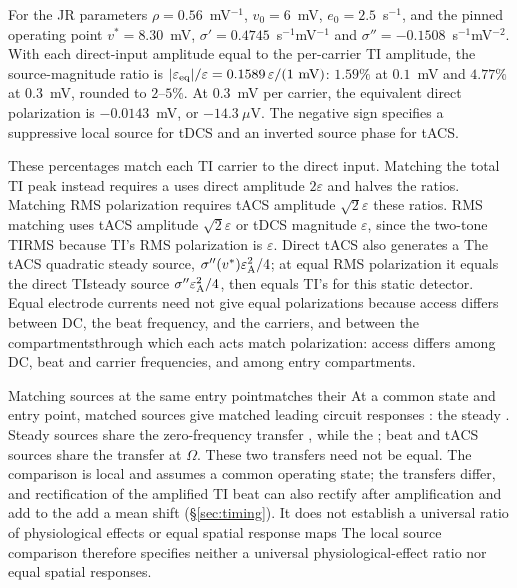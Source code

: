 \documentclass[11pt,a4paper]{article}
\newcommand{\Sig}{\sigma}
\providecommand{\DIFaddtex}[1]{{\protect\color{blue} \sf #1}} %
\providecommand{\DIFdeltex}[1]{{\protect\color{red} \scriptsize #1}} %
\providecommand{\DIFaddbegin}{} %
\providecommand{\DIFaddend}{} %
\providecommand{\DIFdelbegin}{} %
\providecommand{\DIFdelend}{} %
\providecommand{\DIFadd}[1]{\texorpdfstring{\DIFaddtex{#1}}{#1}} %
\providecommand{\DIFdel}[1]{\texorpdfstring{\DIFdeltex{#1}}{}} %
\begin{document}
For the JR parameters $\rho=0.56$~mV$^{-1}$, $v_0=6$~mV,
$e_0=2.5$~s$^{-1}$, and the pinned operating point $v^*=8.30$~mV,
$\Sig'=0.4745$~s$^{-1}$mV$^{-1}$ and
$\Sig''=-0.1508$~s$^{-1}$mV$^{-2}$. With each direct-input amplitude
equal to the per-carrier TI amplitude, the source-magnitude ratio is
$|\varepsilon_{\rm eq}|/\varepsilon
=0.1589\,\varepsilon/(1~\mathrm{mV})$:
$1.59\%$ at $0.1$~mV and $4.77\%$ at $0.3$~mV, rounded to $2$--$5\%$.
At $0.3$~mV per carrier, the equivalent direct polarization is
$-0.0143$~mV, or $-14.3~\mu$V. The negative sign specifies a suppressive
local source for tDCS and an inverted source phase for tACS.

\DIFdelbegin \DIFdel{These percentages match each TI carrier to the direct input. }\DIFdelend Matching the total TI peak instead \DIFdelbegin \DIFdel{requires a }\DIFdelend \DIFaddbegin \DIFadd{uses }\DIFaddend direct amplitude $2\varepsilon$
and halves \DIFdelbegin \DIFdel{the ratios. Matching RMS polarization requires tACS amplitude
$\sqrt{2}\varepsilon$ }\DIFdelend \DIFaddbegin \DIFadd{these ratios. RMS matching uses tACS amplitude
$\sqrt2\varepsilon$ }\DIFaddend or tDCS magnitude $\varepsilon$, \DIFdelbegin \DIFdel{since the two-tone
TIRMS }\DIFdelend \DIFaddbegin \DIFadd{because TI's RMS
polarization }\DIFaddend is $\varepsilon$. \DIFdelbegin \DIFdel{Direct tACS also generates a }\DIFdelend \DIFaddbegin \DIFadd{The tACS }\DIFaddend quadratic steady source,
\DIFdelbegin \DIFdel{$\Sig''(v^*)\varepsilon_{\rm A}^2/4$; at equal RMS polarization it
equals the direct TIsteady source }\DIFdelend \DIFaddbegin \DIFadd{$\Sig''\varepsilon_{\rm A}^2/4$, then equals TI's }\DIFaddend for this static detector.
Equal electrode currents need not \DIFdelbegin \DIFdel{give equal polarizations because access differs between DC, the beat frequency, and the carriers, and between the compartmentsthrough which each acts}\DIFdelend \DIFaddbegin \DIFadd{match polarization: access differs among
DC, beat and carrier frequencies, and among entry compartments}\DIFaddend .

\DIFdelbegin \DIFdel{Matching sources at the same entry pointmatches their }\DIFdelend \DIFaddbegin \DIFadd{At a common state and entry point, matched sources give matched }\DIFaddend leading
circuit responses\DIFdelbegin \DIFdel{:
the steady }\DIFdelend \DIFaddbegin \DIFadd{. Steady }\DIFaddend sources share the zero-frequency transfer\DIFdelbegin \DIFdel{, while the }\DIFdelend \DIFaddbegin \DIFadd{; }\DIFaddend beat
and tACS sources share the transfer at $\Omega$. These \DIFdelbegin \DIFdel{two transfers need not be equal.
The comparison is local and assumes a common operating state; the }\DIFdelend \DIFaddbegin \DIFadd{transfers differ,
and rectification of the amplified }\DIFaddend TI beat can \DIFdelbegin \DIFdel{also rectify after amplification and add to the }\DIFdelend \DIFaddbegin \DIFadd{add a }\DIFaddend mean shift
(\S\ref{sec:timing}). \DIFdelbegin \DIFdel{It does not establish a universal ratio of physiological
effects or equal spatial response maps}\DIFdelend \DIFaddbegin \DIFadd{The local source comparison therefore specifies
neither a universal physiological-effect ratio nor equal spatial responses}\DIFaddend .
\end{document}
